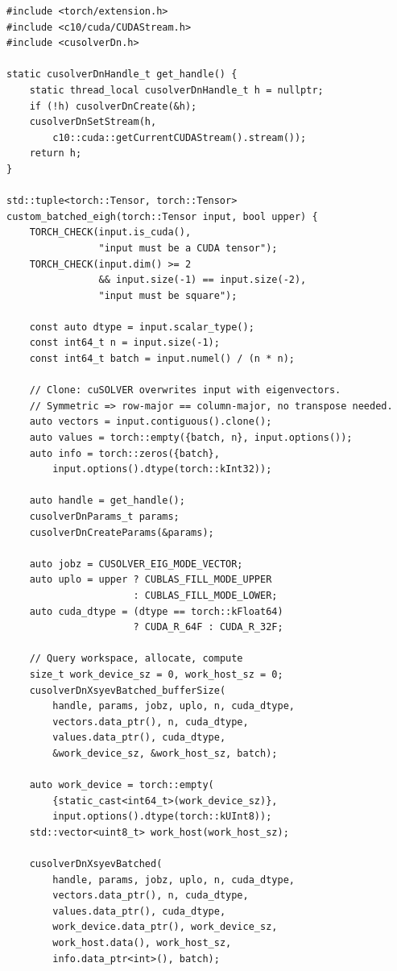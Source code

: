 \documentclass[10pt, letterpaper]{article}
\begin{document}
\begin{lstlisting}
#include <torch/extension.h>
#include <c10/cuda/CUDAStream.h>
#include <cusolverDn.h>

static cusolverDnHandle_t get_handle() {
    static thread_local cusolverDnHandle_t h = nullptr;
    if (!h) cusolverDnCreate(&h);
    cusolverDnSetStream(h,
        c10::cuda::getCurrentCUDAStream().stream());
    return h;
}

std::tuple<torch::Tensor, torch::Tensor>
custom_batched_eigh(torch::Tensor input, bool upper) {
    TORCH_CHECK(input.is_cuda(),
                "input must be a CUDA tensor");
    TORCH_CHECK(input.dim() >= 2
                && input.size(-1) == input.size(-2),
                "input must be square");

    const auto dtype = input.scalar_type();
    const int64_t n = input.size(-1);
    const int64_t batch = input.numel() / (n * n);

    // Clone: cuSOLVER overwrites input with eigenvectors.
    // Symmetric => row-major == column-major, no transpose needed.
    auto vectors = input.contiguous().clone();
    auto values = torch::empty({batch, n}, input.options());
    auto info = torch::zeros({batch},
        input.options().dtype(torch::kInt32));

    auto handle = get_handle();
    cusolverDnParams_t params;
    cusolverDnCreateParams(&params);

    auto jobz = CUSOLVER_EIG_MODE_VECTOR;
    auto uplo = upper ? CUBLAS_FILL_MODE_UPPER
                      : CUBLAS_FILL_MODE_LOWER;
    auto cuda_dtype = (dtype == torch::kFloat64)
                      ? CUDA_R_64F : CUDA_R_32F;

    // Query workspace, allocate, compute
    size_t work_device_sz = 0, work_host_sz = 0;
    cusolverDnXsyevBatched_bufferSize(
        handle, params, jobz, uplo, n, cuda_dtype,
        vectors.data_ptr(), n, cuda_dtype,
        values.data_ptr(), cuda_dtype,
        &work_device_sz, &work_host_sz, batch);

    auto work_device = torch::empty(
        {static_cast<int64_t>(work_device_sz)},
        input.options().dtype(torch::kUInt8));
    std::vector<uint8_t> work_host(work_host_sz);

    cusolverDnXsyevBatched(
        handle, params, jobz, uplo, n, cuda_dtype,
        vectors.data_ptr(), n, cuda_dtype,
        values.data_ptr(), cuda_dtype,
        work_device.data_ptr(), work_device_sz,
        work_host.data(), work_host_sz,
        info.data_ptr<int>(), batch);


\end{lstlisting}
\end{document}
